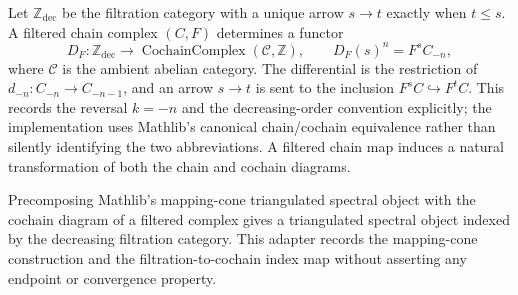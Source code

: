 \begin{definition}
  \label{def:filtered-complex-cochain-diagram}
  \leanok
  Let $\mathbb Z_{\mathrm{dec}}$ be the filtration category with a unique arrow
  $s\to t$ exactly when $t\le s$.  A filtered chain complex $(C,F)$ determines
  a functor
  \[
    D_F:\mathbb Z_{\mathrm{dec}}\longrightarrow
      \operatorname{CochainComplex}(\mathcal C,\mathbb Z),
    \qquad D_F(s)^n=F^sC_{-n},
  \]
  where $\mathcal C$ is the ambient abelian category.
  The differential is the restriction of $d_{-n}:C_{-n}\to C_{-n-1}$, and an
  arrow $s\to t$ is sent to the inclusion $F^sC\hookrightarrow F^tC$.  This
  records the reversal $k=-n$ and the decreasing-order convention explicitly;
  the implementation uses Mathlib's canonical chain/cochain equivalence rather
  than silently identifying the two abbreviations.  A filtered chain map
  induces a natural transformation of both the chain and cochain diagrams.
\end{definition}

\begin{definition}
  \label{def:filtered-complex-triangulated-spectral-object}
  \leanok
  Precomposing Mathlib's mapping-cone triangulated spectral object with the
  cochain diagram of a filtered complex gives a triangulated spectral object
  indexed by the decreasing filtration category.  This adapter records the
  mapping-cone construction and the filtration-to-cochain index map without
  asserting any endpoint or convergence property.
\end{definition}

